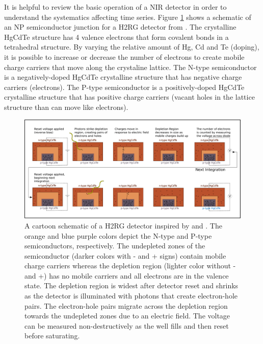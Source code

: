 \documentclass{aastex62}
\begin{document}
It is helpful to review the basic operation of a NIR detector \citep[e.g.][]{rieke2007irDetectorReview} in order to understand the systematics affecting time series.
Figure \ref{fig:npSchematic} shows a schematic of an NP semiconductor junction for a H2RG detector from \citet{smith2008imgPersistence}.
The crystalline HgCdTe structure has 4 valence electrons that form covalent bonds in a tetrahedral structure.
By varying the relative amount of Hg, Cd and Te (doping), it is possible to increase or decrease the number of electrons to create mobile charge carriers that move along the crystaline lattice.
The N-type semiconductor is a negatively-doped HgCdTe crystalline structure that has negative charge carriers (electrons).
The P-type semiconductor is a positively-doped HgCdTe crystalline structure that has positive charge carriers (vacant holes in the lattice structure than can move like electrons).

\begin{figure}[!hbtp]
\centering
\includegraphics[width=.99\columnwidth]{ideal_photodiode.pdf}
\caption{A cartoon schematic of a H2RG detector inspired by \citet{smith2008imgPersistence} and \citet{tulloch2018persistenceH2RG}.
The orange and blue purple colors depict the N-type and P-type semiconductors, respectively.
The undepleted zones of the semiconductor (darker colors with - and + signs) contain mobile charge carriers whereas the depletion region (lighter color without - and +) has no mobile carriers and all electrons are in the valence state.
The depletion region is widest after detector reset and shrinks as the detector is illuminated with photons that create electron-hole pairs.
The electron-hole pairs migrate across the depletion region towards the undepleted zones due to an electric field.
The voltage can be measured non-destructively as the well fills and then reset before saturating.}\label{fig:npSchematic}
\end{figure}
\end{document}
